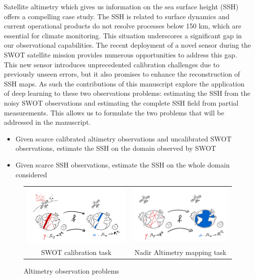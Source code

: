 \begin{bibunit}
  Satellite altimetry which gives us information on the sea surface height (SSH) offers a compelling case study.
  The SSH is related to surface dynamics and current operational products do not resolve processes below 150 km, which are essential for climate monitoring.
  This situation underscores a significant gap in our observational capabilities.
  The recent deployment of a novel sensor during the SWOT satellite mission provides numerous opportunities to address this gap.
  This new sensor introduces unprecedented calibration challenges due to previously unseen errors, but it also promises to enhance the reconstruction of SSH maps.
  As such the contributions of this manuscript explore the application of deep learning to these two observations problems: estimating the SSH from the noisy SWOT observations and estimating the complete SSH field from partial measurements.
  This allows us to formulate the two problems that will be addressed in the manuscript.
  \begin{itemize}
      \item Given scarce calibrated altimetry observations and uncalibrated SWOT observations, estimate the SSH on the domain observed by SWOT
      \item Given scarce SSH observations, estimate the SSH on the whole domain considered
  \end{itemize}
  \begin{figure}
      \centering

          \begin{tabular}{c|c}
            \hspace{-0.2\linewidth}\includegraphics[width=0.7\linewidth]{Introduction/pics/calib_task.png}   & 
            \includegraphics[width=0.7\linewidth]{Introduction/pics/mapping_task.png}\\
           \hspace{-0.2\linewidth} SWOT calibration task & Nadir Altimetry mapping task \\
          \end{tabular}
      \caption{Altimetry observation problems}
      \label{fig:altimetry task}
  \end{figure}


\end{bibunit}
